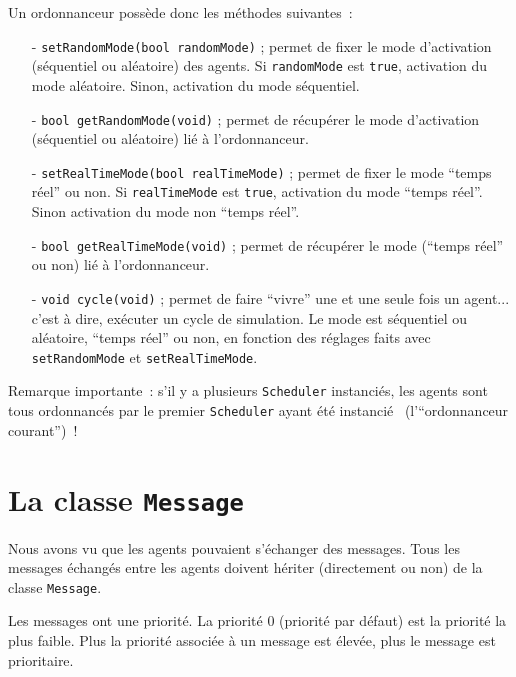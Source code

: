 \documentclass[12pt]{article}
\begin{document}
Un ordonnanceur poss\`ede donc les m\'ethodes suivantes~:
\begin{itemize}
\vspace*{-0.2cm}
\item[-] {\tt setRandomMode(bool randomMode)} ; permet de fixer le
mode d'activation (s\'equen\-tiel ou al\'eatoire) des agents.
Si {\tt randomMode} est {\tt true}, activation du mode al\'eatoire.
Sinon, activation du mode s\'equentiel.
\vspace*{-0.2cm}
\item[-] {\tt bool getRandomMode(void)} ; permet de r\'ecup\'erer
le mode d'activation (s\'equentiel ou al\'eatoire) li\'e \`a l'ordonnanceur.
\vspace*{-0.2cm}
\item[-] {\tt setRealTimeMode(bool realTimeMode)} ; permet de fixer le
mode ``temps r\'eel'' ou non.
Si {\tt realTimeMode} est {\tt true}, activation du mode ``temps r\'eel''.
Sinon activation du mode non ``temps r\'eel''.
\vspace*{-0.2cm}
\item[-] {\tt bool getRealTimeMode(void)} ; permet de r\'ecup\'erer
le mode (``temps r\'eel'' ou non) li\'e \`a l'ordonnanceur.
\vspace*{-0.2cm}
\item[-] {\tt void cycle(void)} ; permet de faire ``vivre'' une et une
seule fois un agent... c'est \`a dire, ex\'ecuter un cycle de simulation.
Le mode est s\'equentiel ou al\'eatoire, ``temps r\'eel'' ou non, en
fonction des r\'eglages faits avec {\tt setRandomMode} et
{\tt setRealTimeMode}.
\end{itemize}

Remarque importante~: s'il y a plusieurs {\tt Scheduler} instanci\'es,
les agents sont tous ordonnanc\'es par le premier {\tt Scheduler} ayant
\'et\'e instanci\'e~ (l'``ordonnanceur courant'')~!

\vspace{-0.3cm}
\section{La classe {\tt Message}}
\label{Message}

\vspace{-0.1cm}
Nous avons vu que les agents pouvaient s'\'echanger des messages.
Tous les messages \'echang\'es entre les agents doivent h\'eriter
(directement ou non) de la classe {\tt Message}.

Les messages ont une priorit\'e. La priorit\'e
0 (priorit\'e par d\'efaut) est la priorit\'e la plus faible.
Plus la priorit\'e associ\'ee \`a un message est \'elev\'ee, plus
le message est prioritaire.
\end{document}
